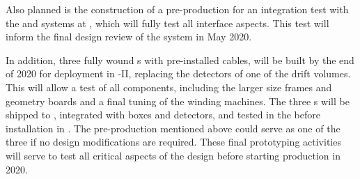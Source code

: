 Also planned is the construction of a pre-production  for an integration test with the  and  systems at , which will fully test all interface aspects. This test will inform the final design review of the  system in May 2020. 

In addition, three fully wound s with pre-installed  cables, will be built by the end of 2020 for deployment in -II, replacing the detectors of one of the drift volumes.  This will allow a test of all  components, including the larger size frames and geometry boards and a final tuning of the winding machines. The three s will be shipped to , integrated with  boxes and  detectors, and tested in the \coldbox before installation in .  The pre-production  mentioned above could serve as one of the three if no design modifications are required.  These final prototyping activities will serve to test all critical aspects of the  design before starting   production in 2020.  

